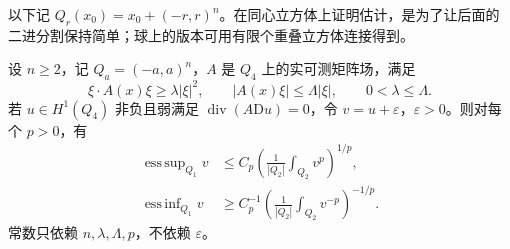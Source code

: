 \ProseParagraphBreak

以下记 \(Q_r(x_0)=x_0+(-r,r)^n\)。在同心立方体上证明估计，是为了让后面的二进分割保持简单；球上的版本可用有限个重叠立方体连接得到。

\begin{lemma}\label{g3:lem:moser-power-estimates}
	设 \(n\ge2\)，记 \(Q_a=(-a,a)^n\)，\(A\) 是 \(Q_4\) 上的实可测矩阵场，满足
	\[
		\xi\cdot A(x)\xi\ge\lambda|\xi|^2,
		\qquad |A(x)\xi|\le\Lambda|\xi|,
		\qquad 0<\lambda\le\Lambda.
	\]
	若 \(u\in H^1(Q_4)\) 非负且弱满足 \(\operatorname{div}(A\mathrm Du)=0\)，令 \(v=u+\varepsilon\)，\(\varepsilon>0\)。则对每个 \(p>0\)，有
	\begin{align}
		\mathop{\mathrm{ess\,sup}}_{Q_1}v
		&\le C_p\left(\frac1{|Q_2|}\int_{Q_2}v^p\right)^{1/p},\label{g3:eq:moser-positive-power}\\
		\mathop{\mathrm{ess\,inf}}_{Q_1}v
		&\ge C_p^{-1}\left(\frac1{|Q_2|}\int_{Q_2}v^{-p}\right)^{-1/p}.\label{g3:eq:moser-negative-power}
	\end{align}
	常数只依赖 \(n,\lambda,\Lambda,p\)，不依赖 \(\varepsilon\)。
\end{lemma}
